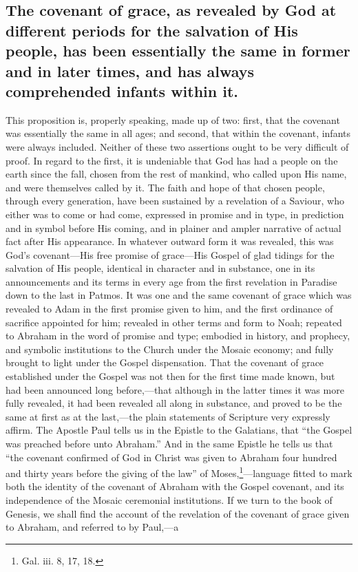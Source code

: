 \documentclass[english,]{book}
\begin{document}
\hypertarget{the-covenant-of-grace-as-revealed-by-god-at-different-periods-for-the-salvation-of-his-people-has-been-essentially-the-same-in-former-and-in-later-times-and-has-always-comprehended-infants-within-it.}{%
\subsection{The covenant of grace, as revealed by God at different periods for the salvation of His people, has been essentially the same in former and in later times, and has always comprehended infants within it.}\label{the-covenant-of-grace-as-revealed-by-god-at-different-periods-for-the-salvation-of-his-people-has-been-essentially-the-same-in-former-and-in-later-times-and-has-always-comprehended-infants-within-it.}}

This proposition is, properly speaking, made up of two: first, that the covenant was essentially the same in all ages; and second, that within the covenant, infants were always included. Neither of these two assertions ought to be very difficult of proof. In regard to the first, it is undeniable that God has had a people on the earth since the fall, chosen from the rest of mankind, who called upon His name, and were themselves called by it. The faith and hope of that chosen people, through every generation, have been sustained by a revelation of a Saviour, who either was to come or had come, expressed in promise and in type, in prediction and in symbol before His coming, and in plainer and ampler narrative of actual fact after His appearance. In whatever outward form it was revealed, this was God's covenant---His free promise of grace---His Gospel of glad tidings for the salvation of His people, identical in character and in substance, one in its announcements and its terms in every age from the first revelation in Paradise down to the last in Patmos. It was one and the same covenant of grace which was revealed to Adam in the first promise given to him, and the first ordinance of sacrifice appointed for him; revealed in other terms and form to Noah; repeated to Abraham in the word of promise and type; embodied in history, and prophecy, and symbolic institutions to the Church under the Mosaic economy; and fully brought to light under the Gospel dispensation. That the covenant of grace established under the Gospel was not then for the first time made known, but had been announced long before,---that although in the latter times it was more fully revealed, it had been revealed all along in substance, and proved to be the same at first as at the last,---the plain statements of Scripture very expressly affirm. The Apostle Paul tells us in the Epistle to the Galatians, that ``the Gospel was preached before unto Abraham.'' And in the same Epistle he tells us that ``the covenant confirmed of God in Christ was given to Abraham four hundred and thirty years before the giving of the law'' of Moses,\footnote{Gal. iii. 8, 17, 18.}---language fitted to mark both the identity of the covenant of Abraham with the Gospel covenant, and its independence of the Mosaic ceremonial institutions. If we turn to the book of Genesis, we shall find the account of the revelation of the covenant of grace given to Abraham, and referred to by Paul,---a 
\end{document}
